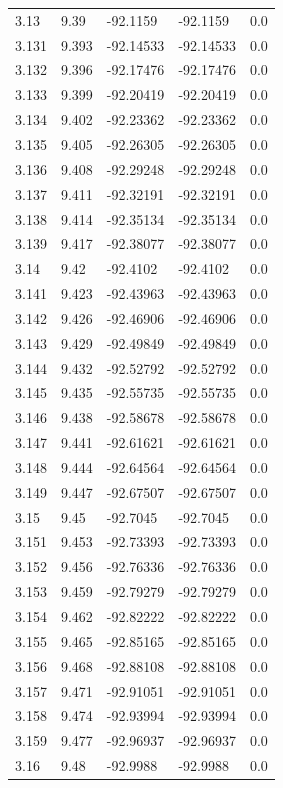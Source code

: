 \begin{tabular}{lllll}
3.13 & 9.39 & -92.1159 & -92.1159 & 0.0 \\
3.131 & 9.393 & -92.14533 & -92.14533 & 0.0 \\
3.132 & 9.396 & -92.17476 & -92.17476 & 0.0 \\
3.133 & 9.399 & -92.20419 & -92.20419 & 0.0 \\
3.134 & 9.402 & -92.23362 & -92.23362 & 0.0 \\
3.135 & 9.405 & -92.26305 & -92.26305 & 0.0 \\
3.136 & 9.408 & -92.29248 & -92.29248 & 0.0 \\
3.137 & 9.411 & -92.32191 & -92.32191 & 0.0 \\
3.138 & 9.414 & -92.35134 & -92.35134 & 0.0 \\
3.139 & 9.417 & -92.38077 & -92.38077 & 0.0 \\
3.14 & 9.42 & -92.4102 & -92.4102 & 0.0 \\
3.141 & 9.423 & -92.43963 & -92.43963 & 0.0 \\
3.142 & 9.426 & -92.46906 & -92.46906 & 0.0 \\
3.143 & 9.429 & -92.49849 & -92.49849 & 0.0 \\
3.144 & 9.432 & -92.52792 & -92.52792 & 0.0 \\
3.145 & 9.435 & -92.55735 & -92.55735 & 0.0 \\
3.146 & 9.438 & -92.58678 & -92.58678 & 0.0 \\
3.147 & 9.441 & -92.61621 & -92.61621 & 0.0 \\
3.148 & 9.444 & -92.64564 & -92.64564 & 0.0 \\
3.149 & 9.447 & -92.67507 & -92.67507 & 0.0 \\
3.15 & 9.45 & -92.7045 & -92.7045 & 0.0 \\
3.151 & 9.453 & -92.73393 & -92.73393 & 0.0 \\
3.152 & 9.456 & -92.76336 & -92.76336 & 0.0 \\
3.153 & 9.459 & -92.79279 & -92.79279 & 0.0 \\
3.154 & 9.462 & -92.82222 & -92.82222 & 0.0 \\
3.155 & 9.465 & -92.85165 & -92.85165 & 0.0 \\
3.156 & 9.468 & -92.88108 & -92.88108 & 0.0 \\
3.157 & 9.471 & -92.91051 & -92.91051 & 0.0 \\
3.158 & 9.474 & -92.93994 & -92.93994 & 0.0 \\
3.159 & 9.477 & -92.96937 & -92.96937 & 0.0 \\
3.16 & 9.48 & -92.9988 & -92.9988 & 0.0 \\

\end{tabular}
